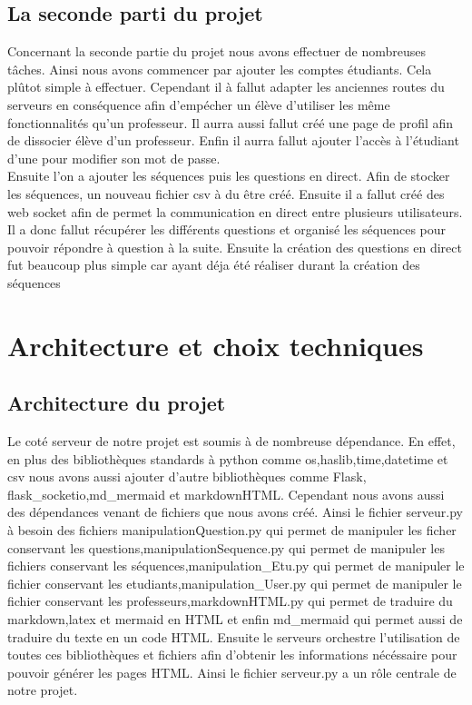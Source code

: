 \documentclass[a4paper, 12pt]{article}
\begin{document}
\subsection{La seconde parti du projet}
Concernant la seconde partie du projet nous avons effectuer de nombreuses tâches.
Ainsi nous avons commencer par ajouter les comptes étudiants. Cela plûtot simple à effectuer. Cependant il à fallut adapter
les anciennes routes du serveurs en conséquence afin d'empécher un élève d'utiliser les même fonctionnalités qu'un professeur.
Il aurra aussi fallut créé une page de profil afin de dissocier élève d'un professeur. Enfin il aurra fallut ajouter l'accès
à l'étudiant d'une pour modifier son mot de passe. \\Ensuite l'on a ajouter les séquences puis les questions en direct. Afin de
stocker les séquences, un nouveau fichier csv à du être créé. Ensuite il a fallut créé des web socket afin de permet la 
communication en direct entre plusieurs utilisateurs. Il a donc fallut récupérer les différents questions et organisé les 
séquences pour pouvoir répondre à question à la suite. Ensuite la création des questions en direct fut beaucoup plus simple 
car ayant déja été réaliser durant la création des séquences 

\section{Architecture et choix techniques}

\subsection{Architecture du projet}
Le coté serveur de notre projet est soumis à de nombreuse dépendance. En effet, en plus des bibliothèques standards à python 
comme os,haslib,time,datetime et csv nous avons aussi ajouter d'autre bibliothèques comme Flask, \\flask\_socketio,md\_mermaid 
et markdownHTML. Cependant nous avons aussi des dépendances venant de fichiers que nous avons créé. Ainsi le fichier 
serveur.py à besoin des fichiers manipulationQuestion.py qui permet de manipuler les ficher conservant les 
questions,manipulationSequence.py qui permet de manipuler les fichiers conservant les séquences,manipulation\_Etu.py qui 
permet de manipuler le fichier conservant les etudiants,manipulation\_User.py qui permet de manipuler le fichier conservant 
les professeurs,markdownHTML.py qui permet de traduire du markdown,latex et mermaid en HTML  et enfin md\_mermaid qui permet
aussi de traduire du texte en un code HTML. Ensuite le serveurs orchestre l'utilisation de toutes ces bibliothèques et fichiers
afin d'obtenir les informations nécéssaire pour pouvoir générer les pages HTML. Ainsi le fichier serveur.py a un rôle centrale
de notre projet.
\end{document}
